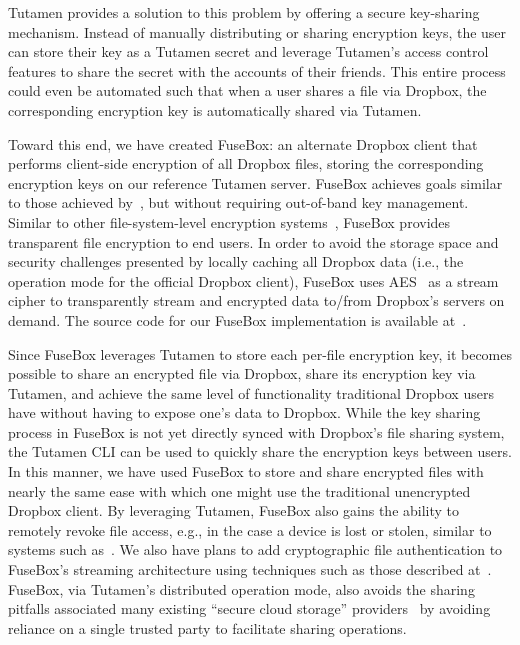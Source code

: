 Tutamen provides a solution to this problem by offering a secure
key-sharing mechanism. Instead of manually distributing or sharing
encryption keys, the user can store their key as a Tutamen secret and
leverage Tutamen's access control features to share the secret with
the accounts of their friends. This entire process could even be
automated such that when a user shares a file via Dropbox, the
corresponding encryption key is automatically shared via Tutamen.

Toward this end, we have created FuseBox: an alternate Dropbox client
that performs client-side encryption of all Dropbox files, storing the
corresponding encryption keys on our reference Tutamen server. FuseBox
achieves goals similar to those achieved by~\cite{goh2003}, but
without requiring out-of-band key management. Similar to other
file-system-level encryption systems~\cite{blaze1993, Cattaneo2001,
  halcrow}, FuseBox provides transparent file encryption to end
users. In order to avoid the storage space and security challenges
presented by locally caching all Dropbox data (i.e., the operation mode
for the official Dropbox client), FuseBox uses AES~\cite{daemen1999,
  nist2001} as a stream cipher to transparently stream and encrypted
data to/from Dropbox's servers on demand.  The source code for our
FuseBox implementation is available at~\cite{fusebox}.

Since FuseBox leverages Tutamen to store each per-file encryption key,
it becomes possible to share an encrypted file via Dropbox, share its
encryption key via Tutamen, and achieve the same level of
functionality traditional Dropbox users have without having to expose
one's data to Dropbox. While the key sharing process in FuseBox is not
yet directly synced with Dropbox's file sharing system, the Tutamen
CLI can be used to quickly share the encryption keys between users. In
this manner, we have used FuseBox to store and share encrypted files
with nearly the same ease with which one might use the traditional
unencrypted Dropbox client. By leveraging Tutamen, FuseBox also gains
the ability to remotely revoke file access, e.g., in the case a device
is lost or stolen, similar to systems such as~\cite{geambasu2011}. We
also have plans to add cryptographic file authentication to FuseBox's
streaming architecture using techniques such as those described
at~\cite{McGrew2005}. FuseBox, via Tutamen's distributed operation
mode, also avoids the sharing pitfalls associated many existing
``secure cloud storage'' providers~\cite{wilson2014} by avoiding
reliance on a single trusted party to facilitate sharing operations.

